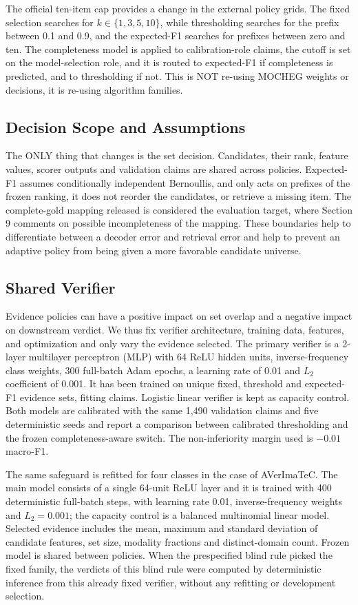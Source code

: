 The official ten-item cap provides a change in the external policy grids. The fixed selection searches for $k \in \{1,3,5,10\}$, while thresholding searches for the prefix between 0.1 and 0.9, and the expected-F1 searches for prefixes between zero and ten. The completeness model is applied to calibration-role claims, the cutoff is set on the model-selection role, and it is routed to expected-F1 if completeness is predicted, and to thresholding if not. This is NOT re-using MOCHEG weights or decisions, it is re-using algorithm families.

\subsection{Decision Scope and Assumptions}

The ONLY thing that changes is the set decision. Candidates, their rank, feature values, scorer outputs and validation claims are shared across policies. Expected-F1 assumes conditionally independent Bernoullis, and only acts on prefixes of the frozen ranking, it does not reorder the candidates, or retrieve a missing item. The complete-gold mapping released is considered the evaluation target, where Section 9 comments on possible incompleteness of the mapping. These boundaries help to differentiate between a decoder error and retrieval error and help to prevent an adaptive policy from being given a more favorable candidate universe.

\subsection{Shared Verifier}

Evidence policies can have a positive impact on set overlap and a negative impact on downstream verdict. We thus fix verifier architecture, training data, features, and optimization and only vary the evidence selected. The primary verifier is a 2-layer multilayer perceptron (MLP) with 64 ReLU hidden units, inverse-frequency class weights, 300 full-batch Adam epochs, a learning rate of 0.01 and $L_2$ coefficient of 0.001. It has been trained on unique fixed, threshold and expected-F1 evidence sets, fitting claims. Logistic linear verifier is kept as capacity control. Both models are calibrated with the same 1,490 validation claims and five deterministic seeds and report a comparison between calibrated thresholding and the frozen completeness-aware switch. The non-inferiority margin used is $-0.01$ macro-F1.

The same safeguard is refitted for four classes in the case of AVerImaTeC. The main model consists of a single 64-unit ReLU layer and it is trained with 400 deterministic full-batch steps, with learning rate 0.01, inverse-frequency weights and $L_2=0.001$; the capacity control is a balanced multinomial linear model. Selected evidence includes the mean, maximum and standard deviation of candidate features, set size, modality fractions and distinct-domain count. Frozen model is shared between policies. When the prespecified blind rule picked the fixed family, the verdicts of this blind rule were computed by deterministic inference from this already fixed verifier, without any refitting or development selection.
